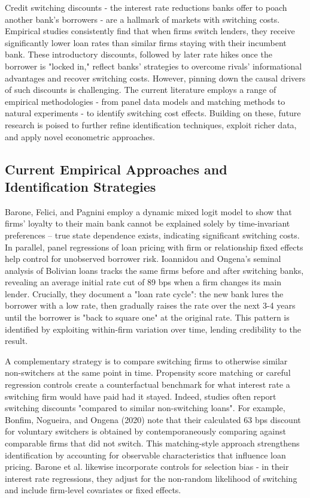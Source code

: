 
Credit switching discounts - the interest rate reductions banks offer to poach another bank's borrowers - are a hallmark of markets with switching costs. Empirical studies consistently find that when firms switch lenders, they receive significantly lower loan rates than similar firms staying with their incumbent bank. These introductory discounts, followed by later rate hikes once the borrower is "locked in," reflect banks' strategies to overcome rivals' informational advantages and recover switching costs. However, pinning down the causal drivers of such discounts is challenging. The current literature employs a range of empirical methodologies - from panel data models and matching methods to natural experiments - to identify switching cost effects. Building on these, future research is poised to further refine identification techniques, exploit richer data, and apply novel econometric approaches. 

\subsection{Current Empirical Approaches and Identification Strategies}

Barone, Felici, and Pagnini employ a dynamic mixed logit model to show that firms' loyalty to their main bank cannot be explained solely by time-invariant preferences -- true state dependence exists, indicating significant switching costs. In parallel, panel regressions of loan pricing with firm or relationship fixed effects help control for unobserved borrower risk. Ioannidou and Ongena's seminal analysis of Bolivian loans tracks the same firms before and after switching banks, revealing an average initial rate cut of 89 bps when a firm changes its main lender. Crucially, they document a "loan rate cycle": the new bank lures the borrower with a low rate, then gradually raises the rate over the next 3-4 years until the borrower is "back to square one" at the original rate. This pattern is identified by exploiting within-firm variation over time, lending credibility to the result. 

A complementary strategy is to compare switching firms to otherwise similar non-switchers at the same point in time. Propensity score matching or careful regression controls create a counterfactual benchmark for what interest rate a switching firm would have paid had it stayed. Indeed, studies often report switching discounts "compared to similar non-switching loans". For example, Bonfim, Nogueira, and Ongena (2020) note that their calculated 63 bps discount for voluntary switchers is obtained by contemporaneously comparing against comparable firms that did not switch. This matching-style approach strengthens identification by accounting for observable characteristics that influence loan pricing. Barone et al. likewise incorporate controls for selection bias - in their interest rate regressions, they adjust for the non-random likelihood of switching and include firm-level covariates or fixed effects. 


